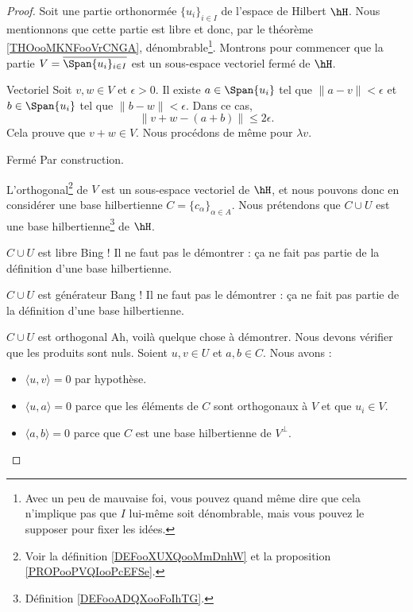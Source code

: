 \begin{proof}
    Soit une partie orthonormée \( \{ u_i \}_{i\in I}\) de l'espace de Hilbert \( \hH\). Nous mentionnons que cette partie est libre et donc, par le théorème \ref{THOooMKNFooVrCNGA}, dénombrable\footnote{Avec un peu de mauvaise foi, vous pouvez quand même dire que cela n'implique pas que \( I\) lui-même soit dénombrable, mais vous pouvez le supposer pour fixer les idées.}.  Montrons pour commencer que la partie \( V=\overline{\Span\{ u_i \}_{i\in I}}\) est un sous-espace vectoriel fermé de \( \hH\).
    \begin{subproof}
        \item[Vectoriel] Soit \( v,w\in V\) et \( \epsilon>0\). Il existe \( a\in \Span\{ u_i \}\) tel que \( \| a-v \|<\epsilon\) et \( b\in \Span\{ u_i \}\) tel que \( \| b-w \|<\epsilon\). Dans ce cas,
            \begin{equation}
                \| v+w-(a+b) \|\leq 2\epsilon.
            \end{equation}
            Cela prouve que \( v+w\in V\). Nous procédons de même pour \( \lambda v\).
        \item[Fermé] Par construction.
    \end{subproof}

    L'orthogonal\footnote{Voir la définition \ref{DEFooXUXQooMmDnhW} et la proposition \ref{PROPooPVQIooPcEFSe}.} de \( V\) est un sous-espace vectoriel de \( \hH\), et nous pouvons donc en considérer une base hilbertienne \( C=\{ c_{\alpha} \}_{\alpha\in A}\). Nous prétendons que \( C\cup U\) est une base hilbertienne\footnote{Définition \ref{DEFooADQXooFoIhTG}.} de \( \hH\).
    \begin{subproof}
        \item[\( C\cup U\) est libre]
            Bing ! Il ne faut pas le démontrer : ça ne fait pas partie de la définition d'une base hilbertienne.
        \item[\( C\cup U\) est générateur]
            Bang ! Il ne faut pas le démontrer : ça ne fait pas partie de la définition d'une base hilbertienne.
        \item[\( C\cup U\) est orthogonal]
            Ah, voilà quelque chose à démontrer. Nous devons vérifier que les produits sont nuls. Soient \( u,v\in U\) et \( a,b\in C\). Nous avons :
            \begin{itemize}
                \item \( \langle u, v\rangle =0\) par hypothèse.
                \item \( \langle u, a\rangle =0\) parce que les éléments de \( C\) sont orthogonaux à \( V\) et que \( u_i\in V\).
                \item \( \langle a, b\rangle =0\) parce que \( C\) est une base hilbertienne de \( V^{\perp}\).
            \end{itemize}


\end{subproof}
\end{proof}
